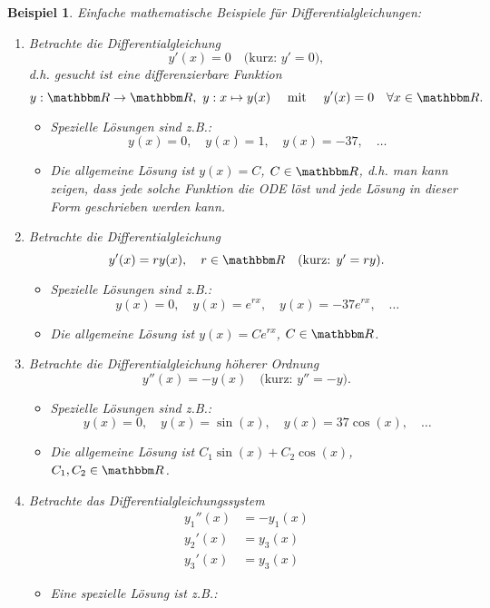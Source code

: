 \documentclass[12pt,a4paper]{book}
\theoremstyle{break}
\newtheorem{beispiel}[theorem]{Beispiel}
\theoremstyle{nonumberplain}
\newcommand{\R}{\mathbbm R}
\newcommand{\1}{\mathbbm{1}} 			      	%
\begin{document}
\begin{beispiel}\label{bsp:ODE_math}
Einfache mathematische Beispiele für Differentialgleichungen:

\begin{enumerate}
\item[(a)] Betrachte die Differentialgleichung 
\[
y'(x)=0 \quad \mbox{(kurz: $y'=0$)},
\]
d.h. gesucht ist eine differenzierbare Funktion 
\[
y: \R\to \R,\ y: x \mapsto y(x)\quad \mbox{ mit } \quad y'(x)=0 \quad \forall x\in \R.
\]
\begin{itemize}
\item \emph{Spezielle} Lösungen sind z.B.: 
\[
y(x)=0, \quad  y(x)=1, \quad y(x)=-37, \quad \ldots
\]
\item Die \emph{allgemeine} Lösung ist $y(x)=C$, $C\in \R$, d.h. man kann zeigen, dass jede solche Funktion
die ODE löst und jede Lösung in dieser Form geschrieben werden kann.
\end{itemize}
%
\item[(b)] Betrachte die Differentialgleichung 
\[
y'(x)= r y(x), \quad r\in \R \quad \mbox{(kurz: $y'=r y$)}.
\]
\begin{itemize}
\item \emph{Spezielle} Lösungen sind z.B.: 
\[
y(x)=0, \quad y(x)=e^{rx}, \quad y(x)=-37e^{rx}, \quad \ldots
\]
\item Die \emph{allgemeine} Lösung ist $y(x)=Ce^{rx}$, $C\in \R$.
\end{itemize}
%
\item[(c)] 
Betrachte die Differentialgleichung \emph{höherer Ordnung} 
\[
y''(x)=-y(x) \quad \mbox{(kurz: $y''=-y$)}.
\]
\begin{itemize}
\item \emph{Spezielle} Lösungen sind z.B.: 
\[
y(x)=0, \quad y(x)=\sin (x), \quad y(x)=37\cos (x), \quad \ldots
\]
\item Die \emph{allgemeine} Lösung ist $C_1 \sin(x) + C_2 \cos(x)$, \quad $C_1,C_2\in \R$.
\end{itemize}
%
\item[(d)] 
Betrachte das \emph{Differentialgleichungssystem} 
\begin{align*}
y_1''(x)& = -y_1(x)\\
y_2'(x)& = y_3(x)\\
y_3'(x)& = y_3(x)
\end{align*}
\begin{itemize}
\item Eine \emph{spezielle} Lösung ist z.B.: 
\begin{align*}

\end{align*}
\end{itemize}
\end{enumerate}
\end{beispiel}
\end{document}
